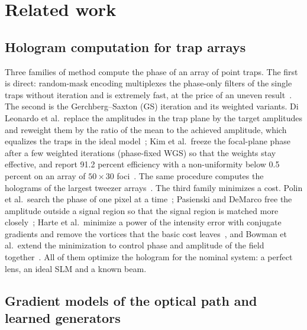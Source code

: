 \section{Related work}\label{sec:related}

\subsection{Hologram computation for trap arrays}

Three families of method compute the phase of an array of point traps. The first is direct: random-mask encoding multiplexes the phase-only filters of the single traps without iteration and is extremely fast, at the price of an
uneven result~\cite{montes2006}. The second is the Gerchberg--Saxton (GS) iteration and its weighted variants. Di Leonardo et al.\ replace the amplitudes in the trap plane by the target amplitudes and reweight them by the ratio of the mean to the
achieved amplitude, which equalizes the traps in the ideal model~\cite{dileonardo2007}; Kim et al.\ freeze the focal-plane phase after a few weighted iterations (phase-fixed WGS) so that the weights stay effective, and report 91.2 percent
efficiency with a non-uniformity below 0.5 percent on an array of $50\times30$ foci~\cite{kim2019}. The same procedure computes the holograms of the largest tweezer arrays~\cite{ebadi2021,manetsch2025}. The third family minimizes a cost.
Polin et al.\ search the phase of one pixel at a time~\cite{polin2005}; Pasienski and DeMarco free the amplitude outside a signal region so that the signal region is matched more closely~\cite{pasienski2008}; Harte et al.\ minimize a
power of the intensity error with conjugate gradients and remove the vortices that the basic cost leaves~\cite{harte2014}, and Bowman et al.\ extend the minimization to control phase and amplitude of the field together~\cite{bowman2017}.
All of them optimize the hologram for the nominal system: a perfect lens, an ideal SLM and a known beam.

\subsection{Gradient models of the optical path and learned generators}

